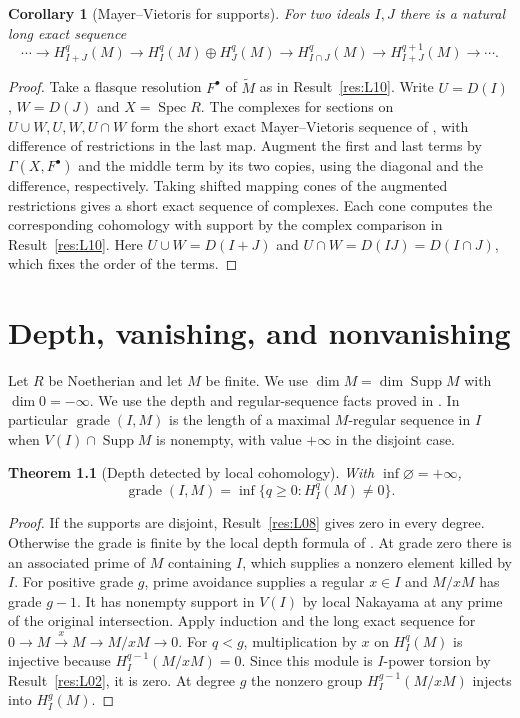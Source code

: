 \documentclass[11pt,oneside,openany]{book}
\newtheorem{theorem}{Theorem}[chapter]
\newtheorem{corollary}[theorem]{Corollary}
\theoremstyle{definition}
\theoremstyle{remark}
\begin{document}
\begin{corollary}[Mayer--Vietoris for supports]\label{res:L11}
For two ideals \(I,J\) there is a natural long exact sequence
\[
 \cdots\to H_{I+J}^q(M)\to H_I^q(M)\oplus H_J^q(M)
 \to H_{I\cap J}^q(M)\to H_{I+J}^{q+1}(M)\to\cdots .
\]
\end{corollary}
\begin{proof}
Take a flasque resolution \(F^\bullet\) of \(\widetilde M\) as in
Result~\ref{res:L10}. Write \(U=D(I)\), \(W=D(J)\) and \(X=\operatorname{Spec}R\).
The complexes for sections on \(U\cup W,U,W,U\cap W\) form the short
exact Mayer--Vietoris sequence of \cite[H05]{homological}, with difference
of restrictions in the last map. Augment the first and last terms by
\(\Gamma(X,F^\bullet)\) and the middle term by its two copies, using the
diagonal and the difference, respectively. Taking shifted mapping cones
of the augmented restrictions gives a short exact sequence of complexes.
Each cone computes the corresponding cohomology with support by the
complex comparison in Result~\ref{res:L10}. Here \(U\cup W=D(I+J)\)
and \(U\cap W=D(IJ)=D(I\cap J)\), which fixes the order of the terms.
\end{proof}
\chapter{Depth, vanishing, and nonvanishing}
\label{ch:depth-and-vanishing}

Let \(R\) be Noetherian and let \(M\) be finite. We use
\(\dim M=\dim\operatorname{Supp} M\) with \(\dim 0=-\infty\).
We use the depth and regular-sequence facts proved in
\cite[DP-01, DP-04--DP-06, CM-01--CM-04]{core}. In particular
\(\operatorname{grade}(I,M)\) is the length of a maximal
\(M\)-regular sequence in \(I\) when \(V(I)\cap\operatorname{Supp}M\)
is nonempty, with value \(+\infty\) in the disjoint case.

\begin{theorem}[Depth detected by local cohomology]\label{res:V01}
With \(\inf\varnothing=+\infty\),
\[
 \operatorname{grade}(I,M)=\inf\{q\geq0:H_I^q(M)\ne0\}.
\]
\end{theorem}
\begin{proof}
If the supports are disjoint, Result~\ref{res:L08} gives zero in every
degree. Otherwise the grade is finite by the local depth formula of
\cite[DP-06]{core}. At grade zero there is an associated prime of \(M\)
containing \(I\), which supplies a nonzero element killed by \(I\).
For positive grade \(g\), prime avoidance supplies a regular
\(x\in I\) and \(M/xM\) has grade \(g-1\). It has nonempty support
in \(V(I)\) by local Nakayama at any prime of the original intersection.
Apply induction and the long exact sequence for
\(0\to M\xrightarrow{x}M\to M/xM\to0\).
For \(q<g\), multiplication by \(x\) on \(H_I^q(M)\) is injective
because \(H_I^{q-1}(M/xM)=0\). Since this module is \(I\)-power
torsion by Result~\ref{res:L02}, it is zero. At degree \(g\) the
nonzero group \(H_I^{g-1}(M/xM)\) injects into \(H_I^g(M)\).
\end{proof}
\end{document}
